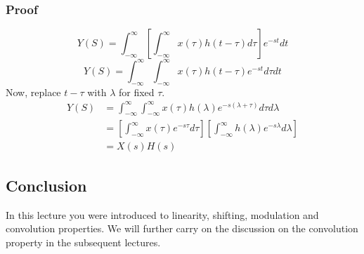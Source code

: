 \subsubsection{Proof}
\[
Y(S) = \int_{-\infty}^{\infty}
			{[\int_{-\infty}^{\infty}{x(\tau)h(t-\tau)d\tau}
			]e^{-st}dt}
\]
\[
Y(S) = \int_{-\infty}^{\infty}
			{\int_{-\infty}^{\infty}{x(\tau)h(t-\tau)
			e^{-st}d\tau}dt}
\]
Now, replace $t - \tau$ with $\lambda$  for fixed $\tau$.
\begin{align*}
Y(S) &= \int_{-\infty}^{\infty}
			{\int_{-\infty}^{\infty}{x(\tau)h(\lambda)
			e^{-s(\lambda+\tau)}d\tau}d\lambda}\\
&= [\int_{-\infty}^{\infty}{x(\tau)e^{-s\tau}d\tau}]
		[\int_{-\infty}^{\infty}{h(\lambda)e^{-s\lambda}d\lambda}]\\
&= X(s)H(s)
\end{align*}

\subsection{Conclusion}
In this lecture you were introduced to linearity, shifting, modulation and convolution properties. We will further carry on the discussion on the convolution property in the subsequent lectures.








                



                     

